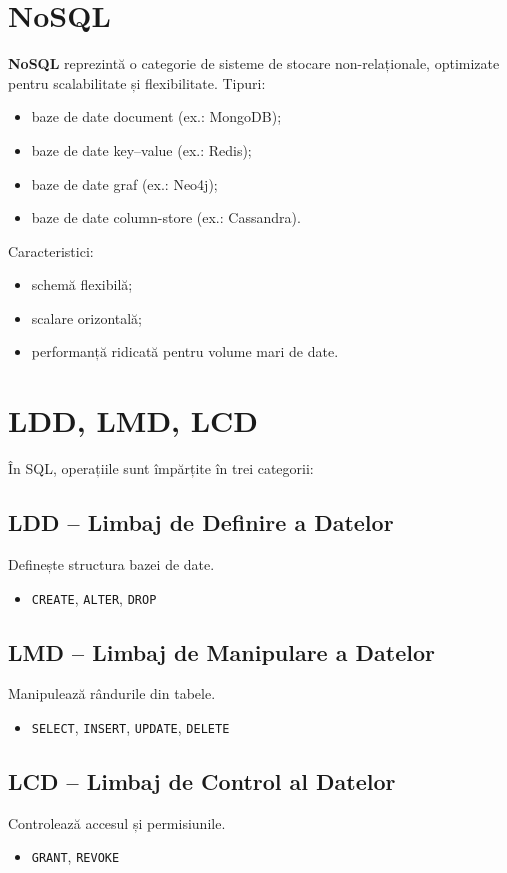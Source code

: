 \documentclass[12pt,a4paper]{article}
\begin{document}
\section{NoSQL}
\textbf{NoSQL} reprezintă o categorie de sisteme de stocare non-relaționale,
optimizate pentru scalabilitate și flexibilitate. Tipuri:
\begin{itemize}[noitemsep]
    \item baze de date document (ex.: MongoDB);
    \item baze de date key--value (ex.: Redis);
    \item baze de date graf (ex.: Neo4j);
    \item baze de date column-store (ex.: Cassandra).
\end{itemize}

Caracteristici:
\begin{itemize}[noitemsep]
    \item schemă flexibilă;
    \item scalare orizontală;
    \item performanță ridicată pentru volume mari de date.
\end{itemize}

\section{LDD, LMD, LCD}
În SQL, operațiile sunt împărțite în trei categorii:

\subsection*{LDD -- Limbaj de Definire a Datelor}
Definește structura bazei de date.
\begin{itemize}[noitemsep]
    \item \texttt{CREATE}, \texttt{ALTER}, \texttt{DROP}
\end{itemize}

\subsection*{LMD -- Limbaj de Manipulare a Datelor}
Manipulează rândurile din tabele.
\begin{itemize}[noitemsep]
    \item \texttt{SELECT}, \texttt{INSERT}, \texttt{UPDATE}, \texttt{DELETE}
\end{itemize}

\subsection*{LCD -- Limbaj de Control al Datelor}
Controlează accesul și permisiunile.
\begin{itemize}[noitemsep]
    \item \texttt{GRANT}, \texttt{REVOKE}
\end{itemize}
\end{document}
